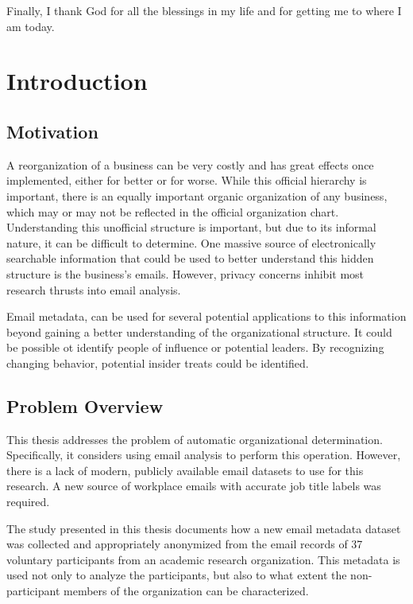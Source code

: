 \documentclass[12pt]{report}
\begin{document}
Finally, I thank God for all the blessings in my life and for getting me to where I am today.
\tableofcontents
\pagebreak

\listoffigures
\pagebreak

\listoftables
\pagebreak

\pagestyle{myheadings}

\chapter{Introduction} \label{Introduction}
\section{Motivation}
A reorganization of a business can be very costly and has great effects once implemented, either for better or for worse.
While this official hierarchy is important, there is an equally important organic organization of any business, which may or may not be reflected in the official organization chart.
Understanding this unofficial structure is important, but due to its informal nature, it can be difficult to determine.
One massive source of electronically searchable information that could be used to better understand this hidden structure is the business's emails.
However, privacy concerns inhibit most research thrusts into email analysis.  

Email metadata, can be used for several potential applications to this information beyond gaining a better understanding of the organizational structure.  It could be possible ot identify people of influence or potential leaders.  By recognizing changing behavior, potential insider treats could be identified.

\section{Problem Overview}
This thesis addresses the problem of automatic organizational determination.
Specifically, it considers using email analysis to perform this operation.
However, there is a lack of modern, publicly available email datasets to use for this research.
A new source of workplace emails with accurate job title labels was required.

The study presented in this thesis documents how a new email metadata dataset was collected and appropriately anonymized from the email records of 37 voluntary participants from an academic research organization.
This metadata is used not only to analyze the participants, but also to what extent the non-participant members of the organization can be characterized.
\end{document}
